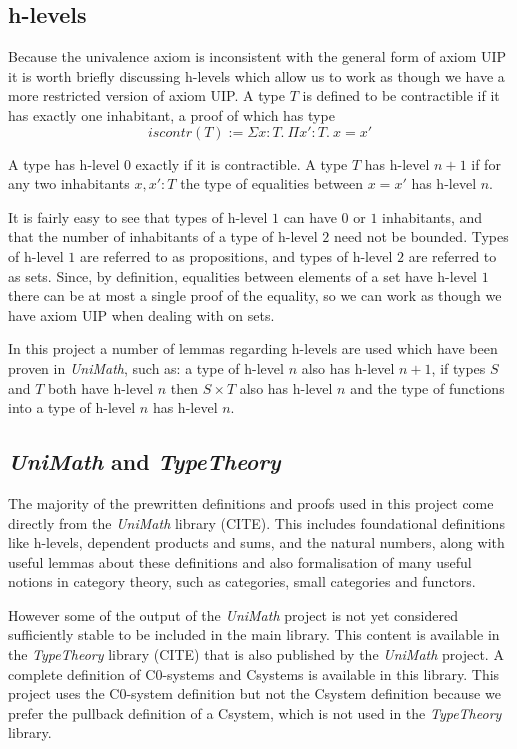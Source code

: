 \subsection{h-levels}
Because the univalence axiom is inconsistent with the general form of axiom UIP
it is worth briefly discussing h-levels which allow us to work as though we have
a more restricted version of axiom UIP. A type $T$ is defined to be contractible
if it has exactly one inhabitant, a proof of which has type
\[iscontr(T) := \Sigma x:T.\ \Pi x':T.\ x=x'\]

A type has h-level $0$ exactly if it is contractible. A type $T$ has h-level
$n+1$ if for any two inhabitants $x, x': T$ the type of equalities between
$x=x'$ has h-level $n$.

It is fairly easy to see that types of h-level $1$ can have $0$ or $1$
inhabitants, and that the number of inhabitants of a type of h-level $2$ need
not be bounded. Types of h-level $1$ are referred to as propositions, and types
of h-level $2$ are referred to as sets. Since, by definition, equalities between
elements of a set have h-level $1$ there can be at most a single proof of the
equality, so we can work as though we have axiom UIP when dealing with on sets.

In this project a number of lemmas regarding h-levels are used which have been
proven in \textit{UniMath}, such as: a type of h-level $n$ also has h-level
$n+1$, if types $S$ and $T$ both have h-level $n$ then $S\times T$ also has
h-level $n$ and the type of functions into a type of h-level $n$ has h-level
$n$.

\subsection{\textit{UniMath} and \textit{TypeTheory}}
The majority of the prewritten definitions and proofs used in this project come
directly from the \textit{UniMath} library (CITE). This includes foundational
definitions like h-levels, dependent products and sums, and the natural numbers,
along with useful lemmas about these definitions and also formalisation of many
useful notions in category theory, such as categories, small categories and
functors.

However some of the output of the \textit{UniMath} project is not yet considered
sufficiently stable to be included in the main library. This content is
available in the \textit{TypeTheory} library (CITE) that is also published by
the \textit{UniMath} project. A complete definition of C0-systems and Csystems
is available in this library. This project uses the C0-system definition but not
the Csystem definition because we prefer the pullback definition of a Csystem,
which is not used in the \textit{TypeTheory} library.
